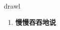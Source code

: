 
\begin{frame}
{\huge drawl}
\begin{center}
\begin{enumerate}\Large
  \item \textbf{慢慢吞吞地说}
\end{enumerate}
\end{center}
\end{frame}
